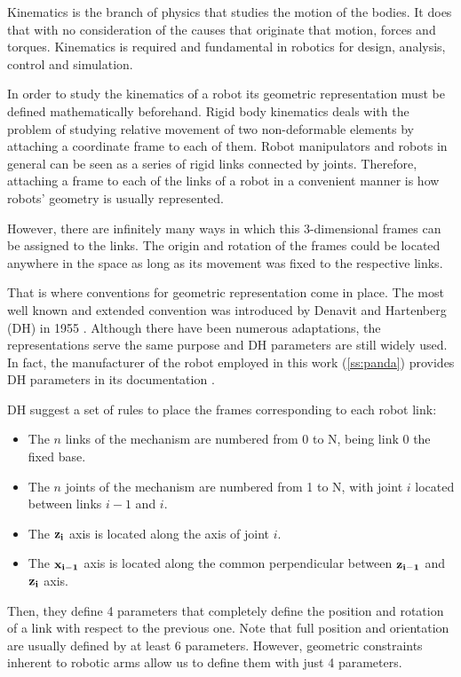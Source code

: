 Kinematics is the branch of physics that studies the motion of the bodies. It does that with no consideration of the causes that originate that motion, forces and torques. Kinematics is required and fundamental in robotics for design, analysis, control and simulation.

In order to study the kinematics of a robot its geometric representation must be defined mathematically beforehand. Rigid body kinematics deals with the problem of studying relative movement of two non-deformable elements by attaching a coordinate frame to each of them. Robot manipulators and robots in general can be seen as a series of rigid links connected by joints. Therefore, attaching a frame to each of the links of a robot in a convenient manner is how robots' geometry is usually represented.

However, there are infinitely many ways in which this 3-dimensional frames can be assigned to the links. The origin and rotation of the frames could be located anywhere in the space as long as its movement was fixed to the respective links.

That is where conventions for geometric representation come in place. The most well known and extended convention was introduced by Denavit and Hartenberg (DH) in 1955 \cite{hartenberg1955kinematic}. Although there have been numerous adaptations, the representations serve the same purpose and DH parameters are still widely used. In fact, the manufacturer of the robot employed in this work (\ref{ss:panda}) provides DH parameters in its documentation \cite{FrankaEmikaPanda}.

DH suggest a set of rules to place the frames corresponding to each robot link:

\begin{itemize}
    \item The $n$ links of the mechanism are numbered from 0 to N, being link 0 the fixed base.
    \item The $n$ joints of the mechanism are numbered from 1 to N, with joint $i$ located between links $i-1$ and $i$.
    \item The $\bf{z_i}$ axis is located along the axis of joint $i$.
    \item The $\bf{x_{i-1}}$ axis is located along the common perpendicular between $\bf{z_{i-1}}$ and $\bf{z_i}$ axis.
\end{itemize}

Then, they define 4 parameters that completely define the position and rotation of a link with respect to the previous one. Note that full position and orientation are usually defined by at least 6 parameters. However, geometric constraints inherent to robotic arms allow us to define them with just 4 parameters.

